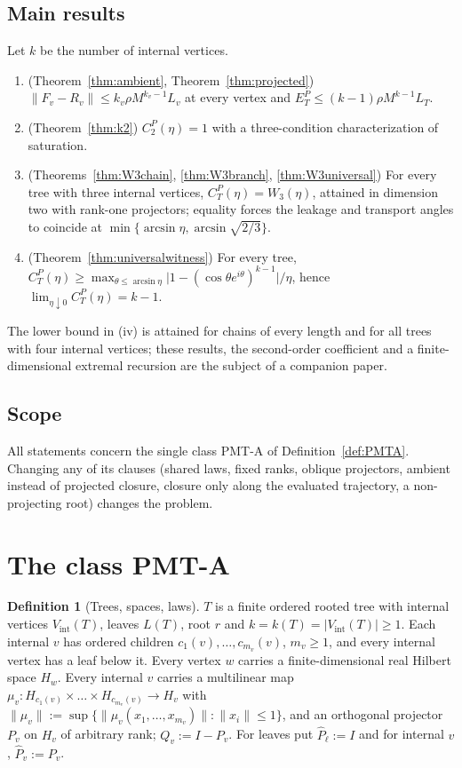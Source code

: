 \documentclass[11pt]{amsart}
\theoremstyle{definition}
\newtheorem{definition}[theorem]{Definition}
\newcommand{\Vint}{V_{\mathrm{int}}}
\newcommand{\norm}[1]{\lVert #1\rVert}
\newcommand{\PMTA}{\textsf{PMT-A}}
\begin{document}
\subsection*{Main results}
Let $k$ be the number of internal vertices.
\begin{enumerate}[label=(\roman*)]
\item (Theorem~\ref{thm:ambient}, Theorem~\ref{thm:projected}) $\norm{F_v-R_v}\le k_v\rho M^{k_v-1}L_v$ at every vertex and $E_T^P\le (k-1)\rho M^{k-1}L_T$.
\item (Theorem~\ref{thm:k2}) $C_2^P(\eta)=1$ with a three-condition characterization of saturation.
\item (Theorems~\ref{thm:W3chain}, \ref{thm:W3branch}, \ref{thm:W3universal}) For every tree with three internal vertices, $C_T^P(\eta)=W_3(\eta)$, attained in dimension two with rank-one projectors; equality forces the leakage and transport angles to coincide at $\min\{\arcsin\eta,\arcsin\sqrt{2/3}\}$.
\item (Theorem~\ref{thm:universalwitness}) For every tree, $C_T^P(\eta)\ge \max_{\theta\le\arcsin\eta}\lvert1-(\cos\theta e^{i\theta})^{k-1}\rvert/\eta$, hence $\lim_{\eta\downarrow0}C^P_T(\eta)=k-1$.
\end{enumerate}
The lower bound in (iv) is attained for chains of every length and for all trees
with four internal vertices; these results, the second-order coefficient and a
finite-dimensional extremal recursion are the subject of a companion paper.

\subsection*{Scope} All statements concern the single class \PMTA{} of
Definition~\ref{def:PMTA}. Changing any of its clauses (shared laws, fixed ranks,
oblique projectors, ambient instead of projected closure, closure only along the
evaluated trajectory, a non-projecting root) changes the problem.

\section{The class \PMTA}\label{sec:class}

\begin{definition}[Trees, spaces, laws]
$T$ is a finite ordered rooted tree with internal vertices $\Vint(T)$, leaves
$L(T)$, root $r$ and $k=k(T)=\lvert\Vint(T)\rvert\ge1$. Each internal $v$ has ordered
children $c_1(v),\dots,c_{m_v}(v)$, $m_v\ge1$, and every internal vertex has a leaf
below it. Every vertex $w$ carries a finite-dimensional real Hilbert space $H_w$.
Every internal $v$ carries a multilinear map
$\mu_v:H_{c_1(v)}\times\dots\times H_{c_{m_v}(v)}\to H_v$ with
$\norm{\mu_v}:=\sup\{\norm{\mu_v(x_1,\dots,x_{m_v})}:\norm{x_i}\le1\}$, and an
orthogonal projector $P_v$ on $H_v$ of arbitrary rank; $Q_v:=I-P_v$. For leaves put
$\widehat P_\ell:=I$ and for internal $v$, $\widehat P_v:=P_v$.
\end{definition}
\end{document}
